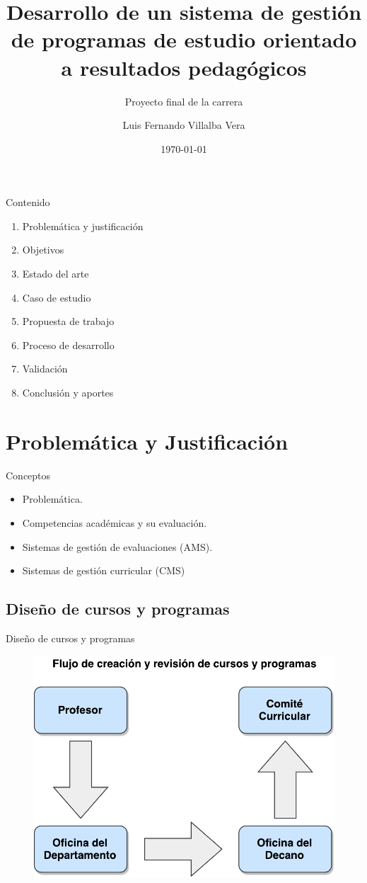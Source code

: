 \documentclass[10pt,xcolor=table ]{beamer}
\title{Desarrollo de un sistema de gestión de programas de estudio orientado a resultados pedagógicos}
\subtitle{Proyecto final de la carrera}
\date{\today}
\author{Luis Fernando Villalba Vera}
\institute{Universidad Católica - Nuestra Señora de la Asunción}
\begin{document}
\maketitle

\begin{frame}{Contenido}
	\begin{enumerate}
	    \item Problemática y justificación
	    \item Objetivos
	    \item Estado del arte
	    \item Caso de estudio
	    \item Propuesta de trabajo
	    \item Proceso de desarrollo
	    \item Validación
	    \item Conclusión y aportes
	 \end{enumerate}
\end{frame}
\section{Problemática y Justificación}
\begin{frame}{Conceptos}
  \begin{itemize}[<+- | alert@+>]
    \item Problemática.
    \item Competencias académicas y su evaluación.
    \item Sistemas de gestión de evaluaciones (AMS).
    \item Sistemas de gestión curricular (CMS)
  \end{itemize}
\end{frame}

\subsection{Diseño de cursos y programas}
\begin{frame}{Diseño de cursos y programas}
	\begin{figure}
		\centering
	    \includegraphics[scale=0.6]{../Figuras/problematica/flujo_autoridades}
	\end{figure}
\end{frame}
\end{document}
